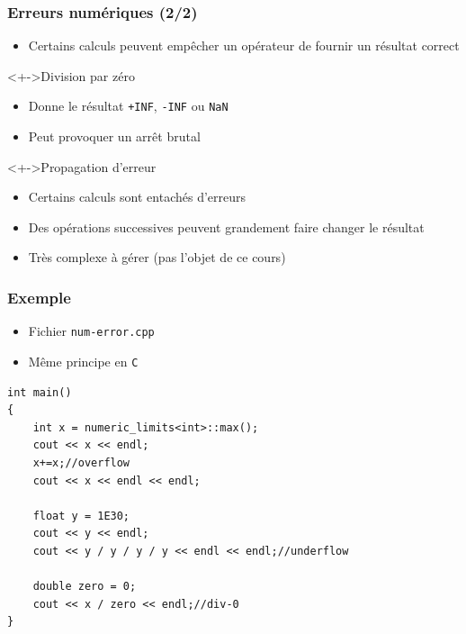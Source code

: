 \begin{frame}
\frametitle{Erreurs numériques (2/2)}
\begin{itemize}[<+->]
\item Certains calculs peuvent empêcher un opérateur de fournir un résultat correct
\end{itemize}
\begin{exampleblock}<+->{Division par zéro}
	\begin{itemize}[<+->]
	\item Donne le résultat \texttt{+INF}, \texttt{-INF} ou \texttt{NaN}
	\item Peut provoquer un arrêt brutal
	\end{itemize}
\end{exampleblock}
\begin{exampleblock}<+->{Propagation d'erreur}
	\begin{itemize}[<+->]
	\item Certains calculs sont entachés d'erreurs
	\item Des opérations successives peuvent grandement faire changer le résultat
	\item Très complexe à gérer (pas l'objet de ce cours)
	\end{itemize}
\end{exampleblock}
\end{frame}

\begin{frame}[containsverbatim]
\frametitle{Exemple}
\begin{itemize}
\item Fichier \texttt{num-error.cpp}
\item Même principe en \texttt{C}
\end{itemize}
\begin{lstlisting}
int main()
{
	int x = numeric_limits<int>::max();
	cout << x << endl;
	x+=x;//overflow
	cout << x << endl << endl;

	float y = 1E30;
	cout << y << endl;
	cout << y / y / y / y << endl << endl;//underflow

	double zero = 0;
	cout << x / zero << endl;//div-0
}
\end{lstlisting}
\end{frame}

